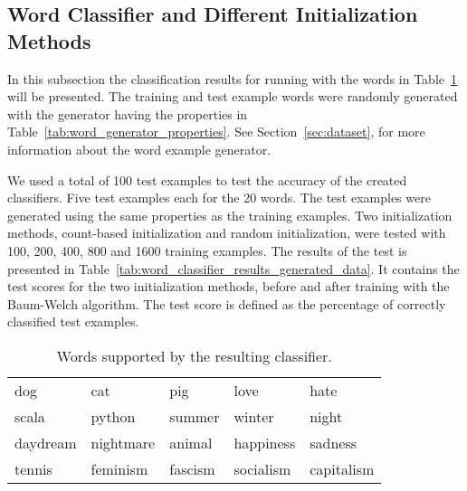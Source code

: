 \subsection{Word Classifier and Different Initialization Methods}\label{sec:word_classifier_results}
In this subsection the classification results for running with the words in Table~\ref{tab:words_supported_by_classifier} will be presented. 
The training and test example words were randomly generated with the generator having the properties in Table~\ref{tab:word_generator_properties}.
See Section~\ref{sec:dataset}, for more information about the word example generator. 

We used a total of 100 test examples to test the accuracy of the created classifiers.
Five test examples each for the 20 words. 
The test examples were generated using the same properties as the training examples.
Two initialization methods, count-based initialization and random initialization, were tested with 100, 200, 400, 800 and 1600 training examples. 
The results of the test is presented in Table~\ref{tab:word_classifier_results_generated_data}. 
It contains the test scores for the two initialization methods, before and after training with the Baum-Welch algorithm. 
The test score is defined as the percentage of correctly classified test examples.

\begin{table}[htb]
  \begin{center}
  \begin{tabular}{ l l l l l }
    dog      & cat       & pig     & love       & hate  \\
    scala    & python    & summer  & winter     & night  \\ 
    daydream & nightmare & animal  & happiness  & sadness \\ 
    tennis   & feminism  & fascism & socialism  & capitalism \\
  \end{tabular}
\end{center}
\caption{Words supported by the resulting classifier.} 
\label{tab:words_supported_by_classifier} 
\end{table}

